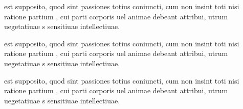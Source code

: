 \documentclass{article}
\begin{document}
\makeatletter

















\begin{ledgroup}
\beginnumbering


\pstart
{}  est  supposito, quod sint passiones totius coniuncti, cum non insint toti nisi ratione partium , cui parti corporis uel animae debeant attribui,  utrum uegetatiuae    s  sensitiuae 
intellectiuae.


\pend

\endnumbering
 \end{ledgroup}



\begin{pairs}
\begin{Rightside}
\beginnumbering


\pstart
{}  est  supposito, quod sint passiones totius coniuncti, cum non insint toti nisi ratione partium , cui parti corporis uel animae debeant attribui,  utrum uegetatiuae    s  sensitiuae 
intellectiuae.


\pend

\endnumbering
\end{Rightside}
\begin{Leftside}
\beginnumbering


\pstart
{}  est  supposito, quod sint passiones totius coniuncti, cum non insint toti nisi ratione partium , cui parti corporis uel animae debeant attribui,  utrum uegetatiuae    s  sensitiuae 
intellectiuae.


\pend

\endnumbering
\end{Leftside}
\end{pairs}
\Columns
\end{document}
